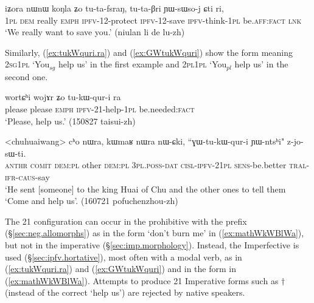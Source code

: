 \begin{exe}
\ex   \label{ex:iZora.tutafsraN}
\gll  iʑora nɯnɯ koŋla ʑo tu-ta-fsraŋ, tu-ta-βri ɲɯ-sɯso-j ɕti ri, \\
\textsc{1pl} \textsc{dem} really \textsc{emph} \textsc{ipfv}-1\fl{}2-protect \textsc{ipfv}-1\fl{}2-save \textsc{ipfv}-think-\textsc{1pl} be.\textsc{aff}:\textsc{fact} \textsc{lnk} \\ 
\glt `We really want to save you.' (niulan li de lu-zh)
\end{exe}

Similarly, (\ref{ex:tukWquri.ra}) and (\ref{ex:GWtukWquri}) show the form  meaning \textsc{2sg}\fl{}\textsc{1pl} `You$_{sg}$ help us' in the first example and \textsc{2pl}\fl{}\textsc{1pl} `You$_{pl}$ help us' in the second one.

\begin{exe}
\ex   \label{ex:tukWquri.ra}
\gll   wortɕʰi wojɤr ʑo tu-kɯ-qur-i ra \\
please please \textsc{emph} \textsc{ipfv}-2\fl{}1-help-\textsc{1pl} be.needed:\textsc{fact} \\
\glt `Please, help us.' (150827 taisui-zh)
\end{exe}

\begin{exe}
\ex   \label{ex:GWtukWquri}
\gll  <chuhuaiwang> cʰo nɯra, kɯmaʁ nɯra nɯ-ɕki, ``ɣɯ-tu-kɯ-qur-i ɲɯ-ntsʰi" z-jo-sɯ-ti. \\
\textsc{anthr} \textsc{comit} \textsc{dem}:\textsc{pl} other \textsc{dem}:\textsc{pl} \textsc{3pl}.\textsc{poss}-\textsc{dat} \textsc{cisl}-\textsc{ipfv}-2\fl{}\textsc{1pl} \textsc{sens}-be.better \textsc{tral}-\textsc{ifr}-\textsc{caus}-say \\
\glt `He sent [someone] to the king Huai of Chu and the other ones to tell them `Come and help us'. (160721 pofuchenzhou-zh)
\end{exe}

The 2\fl{}1 configuration can occur in the prohibitive with the prefix  (§\ref{sec:neg.allomorphs}) as in the form  `don't burn me' in (\ref{ex:mathWkWBlWa}), but not in the imperative (§\ref{sec:imp.morphology}). Instead, the Imperfective is used (§\ref{sec:ipfv.hortative}), most often with a modal verb, as in (\ref{ex:tukWquri.ra}) and (\ref{ex:GWtukWquri}) and in the form  in (\ref{ex:mathWkWBlWa}). Attempts to produce 2\fl{}1 Imperative forms such as $\dagger$ (instead of the correct  `help us') are rejected by native speakers.


